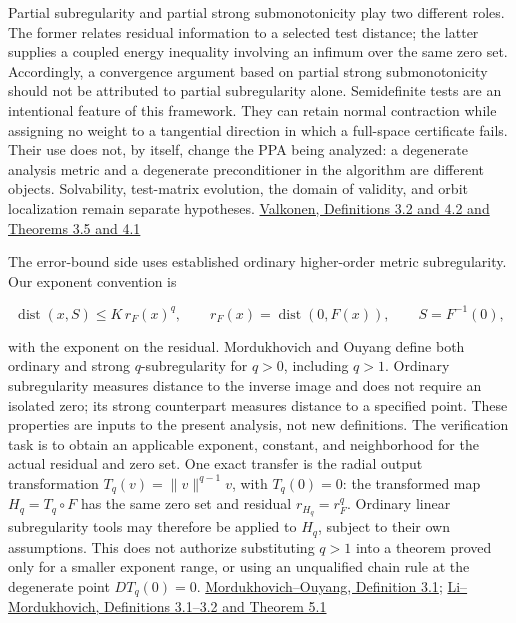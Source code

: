 \documentclass[11pt,a4paper]{article}
\theoremstyle{plain}
\theoremstyle{definition}
\theoremstyle{remark}
\begin{document}
Partial subregularity and partial strong submonotonicity play two
different roles. The former relates residual information to a selected
test distance; the latter supplies a coupled energy inequality involving
an infimum over the same zero set. Accordingly, a convergence argument
based on partial strong submonotonicity should not be attributed to
partial subregularity alone. Semidefinite tests are an intentional
feature of this framework. They can retain normal contraction while
assigning no weight to a tangential direction in which a full-space
certificate fails. Their use does not, by itself, change the PPA being
analyzed: a degenerate analysis metric and a degenerate preconditioner
in the algorithm are different objects. Solvability, test-matrix
evolution, the domain of validity, and orbit localization remain
separate hypotheses. \href{https://arxiv.org/pdf/1711.05123}{Valkonen,
Definitions 3.2 and 4.2 and Theorems 3.5 and 4.1}

The error-bound side uses established ordinary higher-order metric
subregularity. Our exponent convention is

\[
\operatorname{dist}(x,S)\le K\,r_F(x)^q,
\qquad r_F(x)=\operatorname{dist}(0,F(x)),\qquad S=F^{-1}(0),
\]

with the exponent on the residual. Mordukhovich and Ouyang define both
ordinary and strong \(q\)-subregularity for \(q>0\), including \(q>1\).
Ordinary subregularity measures distance to the inverse image and does
not require an isolated zero; its strong counterpart measures distance
to a specified point. These properties are inputs to the present
analysis, not new definitions. The verification task is to obtain an
applicable exponent, constant, and neighborhood for the actual residual
and zero set. One exact transfer is the radial output transformation
\(T_q(v)=\|v\|^{q-1}v\), with \(T_q(0)=0\): the transformed map
\(H_q=T_q\circ F\) has the same zero set and residual \(r_{H_q}=r_F^q\).
Ordinary linear subregularity tools may therefore be applied to \(H_q\),
subject to their own assumptions. This does not authorize substituting
\(q>1\) into a theorem proved only for a smaller exponent range, or
using an unqualified chain rule at the degenerate point \(DT_q(0)=0\).
\href{https://arxiv.org/html/1507.04825v1}{Mordukhovich--Ouyang,
Definition 3.1};
\href{https://optimization-online.org/wp-content/uploads/2012/02/3340.pdf}{Li--Mordukhovich,
Definitions 3.1--3.2 and Theorem 5.1}
\end{document}
